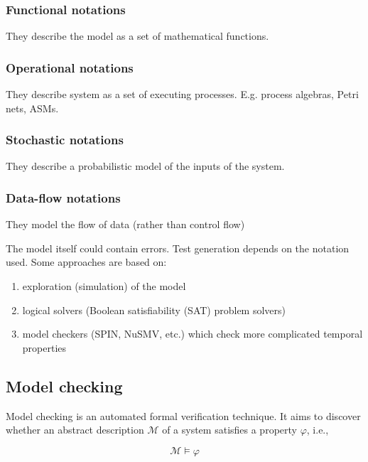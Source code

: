 \subsubsection{Functional notations}

They describe the model as a set of mathematical functions.

\subsubsection{Operational notations}

They describe system as a set of executing processes. E.g. process algebras, Petri nets, ASMs.

\subsubsection{Stochastic notations}

They describe a probabilistic model of the inputs of the system.

\subsubsection{Data-flow notations}

They model the flow of data (rather than control flow)

The model itself could contain errors. Test generation depends on the notation used. Some approaches are based on:

\begin{enumerate}
	\item exploration (simulation) of the model
	\item logical solvers (Boolean satisfiability (SAT) problem solvers)
	\item model checkers (SPIN, NuSMV, etc.) which check more complicated temporal properties
\end{enumerate}

\subsection{Model checking}

Model checking is an automated formal verification technique. It aims to discover whether an abstract description $\mathcal{M}$ of a system satisfies a property $\varphi$, i.e.,

\begin{equation}
	\mathcal{M} \models \varphi
\end{equation}

